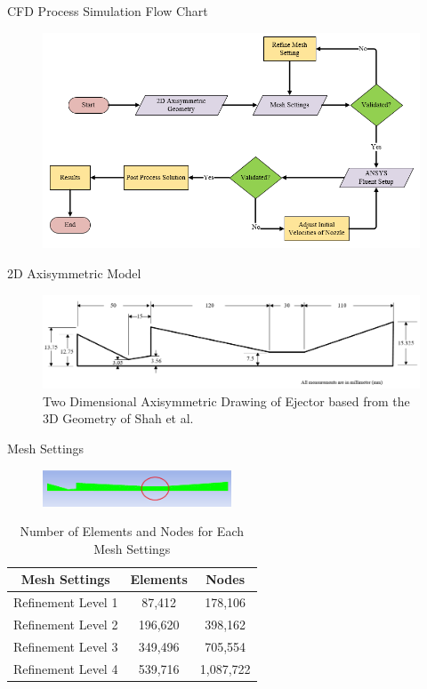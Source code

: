 \begin{frame}{CFD Process Simulation Flow Chart}
    \begin{figure}
    \centering
    \includegraphics[height=0.45\textwidth]{images/SimulationProcessFlowChart.PNG}
    \label{fig:ejectorprocessflowchart}
\end{figure}
\end{frame}

\begin{frame}{2D Axisymmetric Model}
  \begin{figure}[h]
    \centering
    \includegraphics[width=1\textwidth]{images/ejectordrawing.png}
    \caption{Two Dimensional Axisymmetric Drawing of Ejector based from the 3D Geometry of Shah et al.\cite{shah2014experimental}}
    \label{fig:2daxisymmetricejector}
 \end{figure}
\end{frame}

\begin{frame}{Mesh Settings}
   \begin{figure}[h]
    \centering
    \includegraphics[width=0.5\textwidth]{images/Meshemphasized.png}
    \label{fig:meshrefinement1}
  \end{figure}
  \begin{table}[h]
      \centering
       \caption{Number of Elements and Nodes for Each Mesh Settings}
      \label{tab:meshelementsandnodes}
      \begin{tabular}{ccc}
      \hline
         Mesh Settings  &  Elements & Nodes\\
      \hline
         Refinement Level 1  & 87,412 & 178,106 \\
         Refinement Level 2 & 196,620 & 398,162 \\
         Refinement Level 3 & 349,496 & 705,554 \\
         Refinement Level 4 & 539,716 & 1,087,722 \\
      \hline
      \end{tabular}
  \end{table}
\end{frame}

